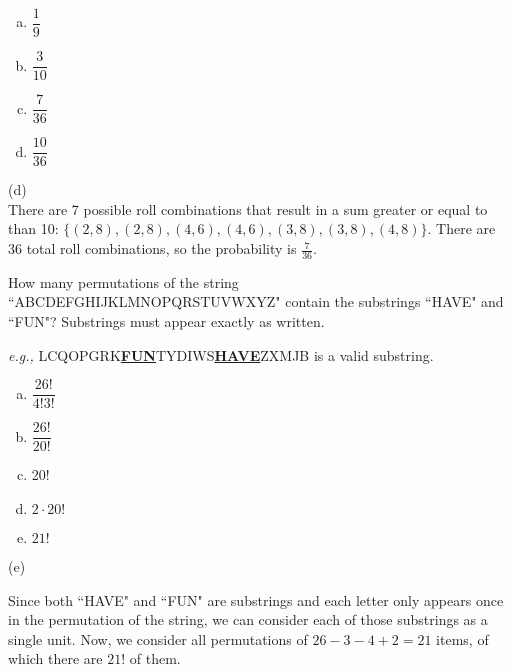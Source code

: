 \begin{solution}
\begin{enumerate}[(a)]
	\item  $\dfrac{1}{9}$ %

	\item  $\dfrac{3}{10}$ %

	\item  $\dfrac{7}{36}$ %

	\item  $\dfrac{10}{36}$ %

\end{enumerate}
\begin{solution}

(d)\\
There are 7 possible roll combinations that result in a sum greater or equal to than 10: $\{(2,8), (2,8), (4,6), (4,6), (3,8), (3,8), (4,8)\}$. There are 36 total roll combinations, so the probability is $\frac{7}{36}$.

\end{solution}


How many permutations of the string ``ABCDEFGHIJKLMNOPQRSTUVWXYZ" contain the substrings ``HAVE" and ``FUN"?
Substrings must appear exactly as written. 

\textit{e.g.,} LCQOPGRK\underline{\textbf{FUN}}TYDIWS\underline{\textbf{HAVE}}ZXMJB is a valid substring.
\begin{enumerate}[(a)]
	\item  $\dfrac{26!}{4!3!}$
    
	\item  $\dfrac{26!}{20!}$
    
	\item  20!
    
	\item  $2 \cdot 20!$
    
	\item  $21!$

\end{enumerate}
\begin{solution}


(e)

Since both ``HAVE" and ``FUN" are substrings and each letter only appears once in the permutation of the string, we can consider each of those substrings as a single unit. Now, we consider all permutations of $26 - 3 - 4 + 2= 21$ items, of which there are $21!$ of them. 


\end{solution}
\end{solution}

